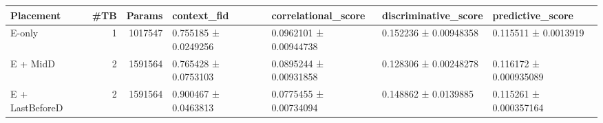 \begin{tabular}{lrrllll}
\toprule
      Placement &  \#TB &  Params &          context\_fid &    correlational\_score &  discriminative\_score &       predictive\_score \\
\midrule
         E-only &    1 & 1017547 & 0.755185 ± 0.0249256 & 0.0962101 ± 0.00944738 & 0.152236 ± 0.00948358 &   0.115511 ± 0.0013919 \\
       E + MidD &    2 & 1591564 & 0.765428 ± 0.0753103 & 0.0895244 ± 0.00931858 & 0.128306 ± 0.00248278 & 0.116172 ± 0.000935089 \\
E + LastBeforeD &    2 & 1591564 & 0.900467 ± 0.0463813 & 0.0775455 ± 0.00734094 &  0.148862 ± 0.0139885 & 0.115261 ± 0.000357164 \\
\bottomrule
\end{tabular}

